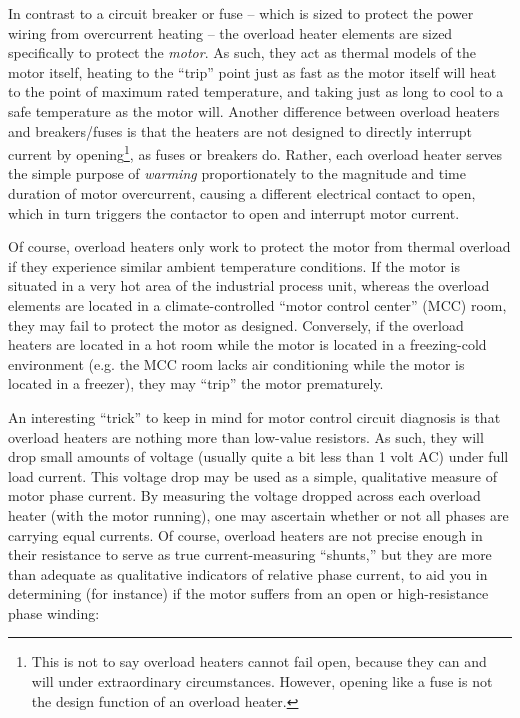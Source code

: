 In contrast to a circuit breaker or fuse -- which is sized to protect the power wiring from overcurrent heating -- the overload heater elements are sized specifically to protect the \textit{motor}.  As such, they act as thermal models of the motor itself, heating to the ``trip'' point just as fast as the motor itself will heat to the point of maximum rated temperature, and taking just as long to cool to a safe temperature as the motor will.  Another difference between overload heaters and breakers/fuses is that the heaters are not designed to directly interrupt current by opening\footnote{This is not to say overload heaters cannot fail open, because they can and will under extraordinary circumstances.  However, opening like a fuse is not the design function of an overload heater.}, as fuses or breakers do.  Rather, each overload heater serves the simple purpose of \textit{warming} proportionately to the magnitude and time duration of motor overcurrent, causing a different electrical contact to open, which in turn triggers the contactor to open and interrupt motor current.

Of course, overload heaters only work to protect the motor from thermal overload if they experience similar ambient temperature conditions.  If the motor is situated in a very hot area of the industrial process unit, whereas the overload elements are located in a climate-controlled ``motor control center'' (MCC) room, they may fail to protect the motor as designed.  Conversely, if the overload heaters are located in a hot room while the motor is located in a freezing-cold environment (e.g. the MCC room lacks air conditioning while the motor is located in a freezer), they may ``trip'' the motor prematurely.    

\vskip 10pt

An interesting ``trick'' to keep in mind for motor control circuit diagnosis is that overload heaters are nothing more than low-value resistors.  As such, they will drop small amounts of voltage (usually quite a bit less than 1 volt AC) under full load current.  This voltage drop may be used as a simple, qualitative measure of motor phase current.  By measuring the voltage dropped across each overload heater (with the motor running), one may ascertain whether or not all phases are carrying equal currents.  Of course, overload heaters are not precise enough in their resistance to serve as true current-measuring ``shunts,'' but they are more than adequate as qualitative indicators of relative phase current, to aid you in determining (for instance) if the motor suffers from an open or high-resistance phase winding:

